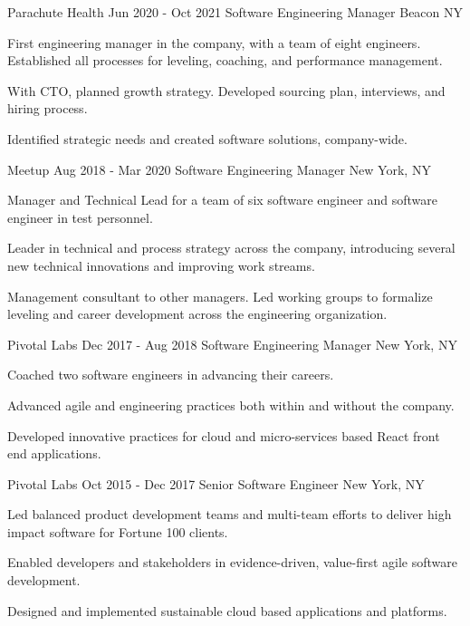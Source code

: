 \documentclass[10pt]{article}
\begin{document}
{	\job
	{Parachute Health}
	{Jun 2020 - Oct 2021}
	{Software Engineering Manager}
	{Beacon NY}
	{
	\begin{newitemize}
		\item {	First engineering manager in the company, with a team of eight engineers. Established all processes for leveling, coaching, and performance management.}
		\item {With CTO, planned growth strategy. Developed sourcing plan, interviews, and hiring process.}
		\item {Identified strategic needs and created software solutions, company-wide.}
	\end{newitemize}
	}

	\job
	{Meetup}
	{Aug 2018 - Mar 2020}
	{Software Engineering Manager}
	{New York, NY}
	{
	\begin{newitemize}
		\item Manager and Technical Lead for a team of six software engineer and software
		engineer in test personnel.
		\item Leader in technical and process strategy across the company, introducing several
		new technical innovations and improving work streams.
		\item Management consultant to other managers. Led working groups to formalize leveling and
		career development across the engineering organization.
	\end{newitemize}
	}

	\job
	{Pivotal Labs}
	{Dec 2017 - Aug 2018}
	{Software Engineering Manager}
	{New York, NY}
	{
	\begin{newitemize}
		\item Coached two software engineers in advancing their careers.
		\item Advanced agile and engineering practices both within and without the company.
		\item Developed innovative practices for cloud and micro-services based React front end applications.
	\end{newitemize}
	}

	\job
	{Pivotal Labs}
	{Oct 2015 - Dec 2017}
	{Senior Software Engineer}
	{New York, NY}
	{
	\begin{newitemize}
		\item Led balanced product development teams and multi-team efforts to deliver high impact software for
		Fortune 100 clients.
		\item Enabled developers and stakeholders in evidence-driven, value-first agile software development.
		\item Designed and implemented sustainable cloud based applications and platforms.
	\end{newitemize}
	}

}
\end{document}
